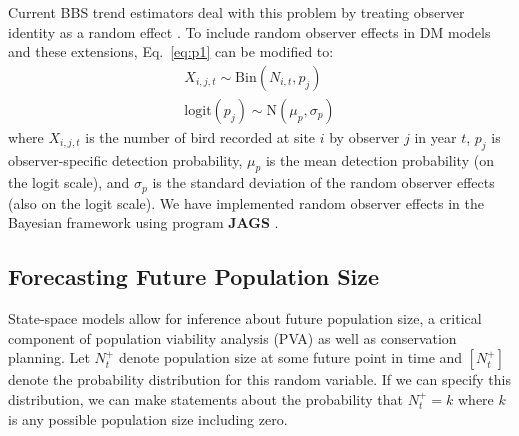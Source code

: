 \documentclass[12pt]{article}
\begin{document}
Current BBS trend estimators deal with this problem by
treating observer identity as a random %
effect \citep{link_sauer:2002,sauer_link:2011}.
%
To include random observer effects in DM models and these
extensions, Eq.~\ref{eq:p1} can be modified to:
\begin{gather}
X_{i,j,t} \sim \mathrm{Bin}(N_{i,t}, p_j) \nonumber \\
\mathrm{logit}(p_j) \sim \mathrm{N}(\mu_p, \sigma_p)
\label{eq:pobs}
\end{gather}
where $X_{i,j,t}$ is the number of bird recorded at site $i$ by
observer $j$ in year $t$, $p_j$ is observer-specific detection probability,
$\mu_p$ is the mean detection probability (on the logit scale), and $\sigma_p$ is
the standard deviation of the random observer effects (also on the logit scale). 
We have implemented random observer effects in the Bayesian
framework using program \textbf{JAGS} \citep[version 3.2.0, see Appendix]{plummer:2003}.



\subsection{Forecasting Future Population Size}

State-space models allow for inference about future population size,
a critical component of population viability analysis (PVA) as well
as conservation planning. Let $N^+_{t}$ denote population size at some
future point in time and $[N^+_t]$ denote the probability
distribution for this random variable. If we can specify this
distribution, we can make statements about the
probability that $N^+_t = k$ where $k$ is any possible
population size including zero.
\end{document}
